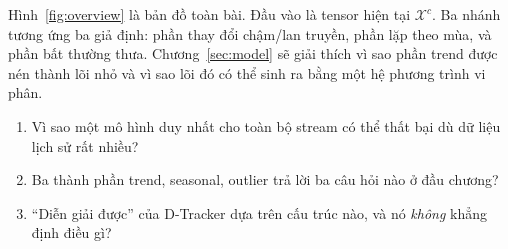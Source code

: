 Hình~\ref{fig:overview} là bản đồ toàn bài. Đầu vào là tensor hiện tại $\mathcal{X}^{c}$.
Ba nhánh tương ứng ba giả định: phần thay đổi chậm/lan truyền, phần lặp theo mùa, và phần bất
thường thưa. Chương~\ref{sec:model} sẽ giải thích vì sao phần trend được nén thành lõi nhỏ và
vì sao lõi đó có thể sinh ra bằng một hệ phương trình vi phân.

\begin{selfcheck}
\begin{enumerate}
  \item Vì sao một mô hình duy nhất cho toàn bộ stream có thể thất bại dù dữ liệu lịch sử rất nhiều?
  \item Ba thành phần trend, seasonal, outlier trả lời ba câu hỏi nào ở đầu chương?
  \item ``Diễn giải được'' của D-Tracker dựa trên cấu trúc nào, và nó \emph{không} khẳng định điều gì?
\end{enumerate}
\end{selfcheck}
